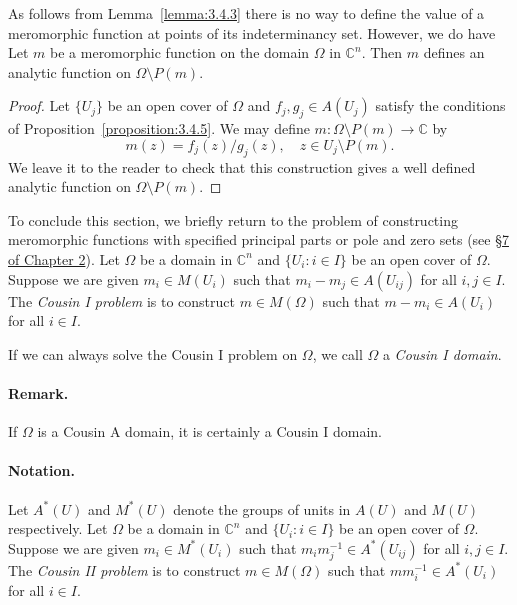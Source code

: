 As follows from Lemma~\ref{lemma:3.4.3} there is no way to define the value of a meromorphic function at points of its indeterminancy set. However, we do have
 Let $m$ be a meromorphic function on the domain $\Omega$ in $\mathbb C^n$. Then $m$ defines an analytic function on $\Omega\setminus P(m)$.
\begin{proof}
Let $\{U_j\}$ be an open cover of $\Omega$ and $f_j,g_j\in A(U_j)$ satisfy the conditions of Proposition~\ref{proposition:3.4.5}. We may define $m:\Omega\setminus P(m)\to\mathbb C$ by
\[m(z)=f_j(z)/g_j(z),\quad z\in U_j\setminus P(m).\]
We leave it to the reader to check that this construction gives a well defined analytic function on $\Omega\setminus P(m)$.
\end{proof}
To conclude this section, we briefly return to the problem of constructing meromorphic functions with specified principal parts or pole and zero sets (see \hyperref[sec:2:7]{\S7 of Chapter 2}).
 Let $\Omega$ be a domain in $\mathbb C^n$ and $\{U_i:i\in I\}$ be an open cover of $\Omega$. Suppose we are given $m_i\in M(U_i)$ such that $m_i-m_j\in A(U_{ij})$ for all $i,j\in I$. The \emph{Cousin I problem} is to construct $m\in M(\Omega)$ such that $m-m_i\in A(U_i)$ for all $i\in I$.

If we can always solve the Cousin I problem on $\Omega$, we call $\Omega$ a \emph{Cousin I domain}.
\paragraph*{Remark.} If $\Omega$ is a Cousin A domain, it is certainly a Cousin I domain.
\paragraph*{Notation.} Let $A^*(U)$ and $M^*(U)$ denote the groups of units in $A(U)$ and $M(U)$ respectively.
 Let $\Omega$ be a domain in $\mathbb C^n$ and $\{U_i:i\in I\}$ be an open cover of $\Omega$. Suppose we are given $m_i\in M^*(U_i)$ such that $m_im_j^{-1}\in A^*(U_{ij})$ for all $i,j\in I$. The \emph{Cousin II problem} is to construct $m\in M(\Omega)$ such that $mm_i^{-1}\in A^*(U_i)$ for all $i\in I$.

